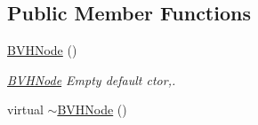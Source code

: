 \subsection*{Public Member Functions}
\begin{DoxyCompactItemize}
\item 
\hypertarget{classBVHNode_abb536bca7ddda5cd8a21d6246193f3a5}{\hyperlink{classBVHNode_abb536bca7ddda5cd8a21d6246193f3a5}{B\-V\-H\-Node} ()}\label{classBVHNode_abb536bca7ddda5cd8a21d6246193f3a5}

\begin{DoxyCompactList}\small\item\em \hyperlink{classBVHNode}{B\-V\-H\-Node} Empty default ctor,. \end{DoxyCompactList}\item 
\hypertarget{classBVHNode_a77faa5107236f51786cf3e4782d302ac}{virtual \hyperlink{classBVHNode_a77faa5107236f51786cf3e4782d302ac}{$\sim$\-B\-V\-H\-Node} ()}\label{classBVHNode_a77faa5107236f51786cf3e4782d302ac}


\end{DoxyCompactItemize}
